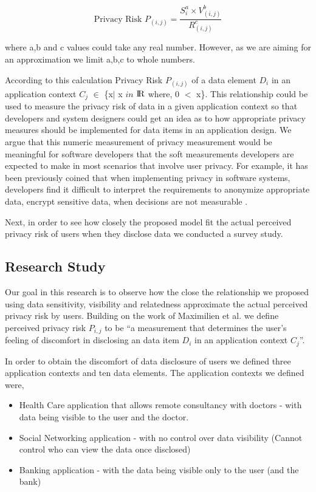 \documentclass[10pt]{article}
\begin{document}
\[
\text {Privacy Risk $P_{(i,j)}$} =\frac{S_{i}^a \times V_{(i,j)}^b}{R_{(i,j)}^ c}
\]

where a,b and c values could take any real number. However, as we are aiming for an approximation we limit a,b,c to whole numbers.

According to this calculation Privacy Risk $P_{(i,j)}$  of a data element \textit {$D_i$} in an application context \textit {$C_j$} $\in$ \{x$\mid$ x $in$ ${\rm I\!R}$ where, 0 $<$ x\}. This relationship could be used to measure the privacy risk of data in a given application context so that developers and system designers could get an idea as to how appropriate privacy measures should be implemented for data items in an application design. We argue that this numeric measurement of privacy measurement would be meaningful for software developers that the soft measurements developers are expected to make in most scenarios that involve user privacy. For example, it has been previously coined that when implementing privacy in software systems, developers find it difficult to interpret the requirements to anonymize appropriate data, encrypt sensitive data, when decisions are not measurable \cite {senarath2018why}. 



Next, in order to see how closely the proposed model fit the actual perceived privacy risk of users when they disclose data we conducted a survey study.

\subsection {Research Study}

Our goal in this research is to observe how the close the relationship we proposed using data sensitivity, visibility and relatedness approximate the actual perceived privacy risk by users. Building on the work of Maximilien et al. \cite {maximilien2009privacy} we define perceived privacy risk $P_{i,j}$ to be \enquote{a measurement that determines the user's feeling of discomfort in disclosing an data item \textit {$D_i$} in an application context \textit {$C_j$}}. 

In order to obtain the discomfort of data disclosure of users we defined three application contexts and ten data elements. The application contexts we defined were,

\begin{itemize}
\item Health Care application that allows remote consultancy with doctors - with data being visible to the user and the doctor.
\item Social Networking application - with no control over data visibility (Cannot control who can view the data once disclosed)
\item Banking application - with the data being visible only to the user (and the bank)
\end{itemize}
\end{document}
